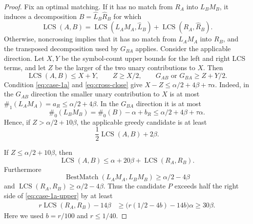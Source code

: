 \documentclass[11pt]{article}
\theoremstyle{remark}
\newcommand{\LCS}{\operatorname{LCS}}
\newcommand{\BestMatch}{\operatorname{BestMatch}}
\begin{document}
\begin{proof}
Fix an optimal matching.  If it has no match from $R_A$ into
$L_BM_B$, it induces a decomposition $B=\widehat L_B\widehat R_B$
for which
\[
 \LCS(A,B)
 =\LCS(L_AM_A,\widehat L_B)
  +\LCS(R_A,\widehat R_B).
\]
Otherwise, noncrossing implies that it has no match from $L_AM_A$
into $R_B$, and the transposed decomposition used by $G_{BA}$ applies.
Consider the applicable direction.  Let $X,Y$ be the symbol-count
upper bounds for the left and right LCS terms, and let $Z$ be the
larger of the two unary contributions to $X$.  Then
\begin{equation}\label{eq:XYZ}
 \LCS(A,B)\le X+Y,\qquad Z\ge X/2,\qquad
 G_{AB}\text{ or }G_{BA}\ge Z+Y/2.
\end{equation}
Condition \eqref{eq:case-1a} and \eqref{eq:cross-close} give
$X-Z\le\alpha/2+4\beta+\tau\alpha$.  Indeed, in the $G_{AB}$
direction the smaller unary contribution to $X$ is at most
$\#_1(L_AM_A)=a_R\le\alpha/2+4\beta$.  In the $G_{BA}$ direction it
is at most
\[
 \#_0(L_BM_B)=\#_0(B)-\alpha+b_R
 \le\alpha/2+4\beta+\tau\alpha.
\]
Hence, if
$Z>\alpha/2+10\beta$, the applicable greedy candidate is at least
\[
 \frac12\LCS(A,B)+2\beta.
\]

If $Z\le\alpha/2+10\beta$, then
\begin{equation}\label{eq:case-1a-upper}
 \LCS(A,B)\le\alpha+20\beta+\LCS(R_A,R_B).
\end{equation}
Furthermore
\[
 \BestMatch(L_AM_A,L_BM_B)\ge\alpha/2-4\beta
\]
and
$\LCS(R_A,R_B)\ge\alpha/2-4\beta$.  Thus the candidate $P$ exceeds
half the right side of \eqref{eq:case-1a-upper} by at least
\begin{align*}
 r\LCS(R_A,R_B)-14\beta
 &\ge\bigl(r(1/2-4b)-14b\bigr)\alpha
 \ge30\beta.
\end{align*}
Here we used $b=r/100$ and $r\le1/40$.


\end{proof}
\end{document}
